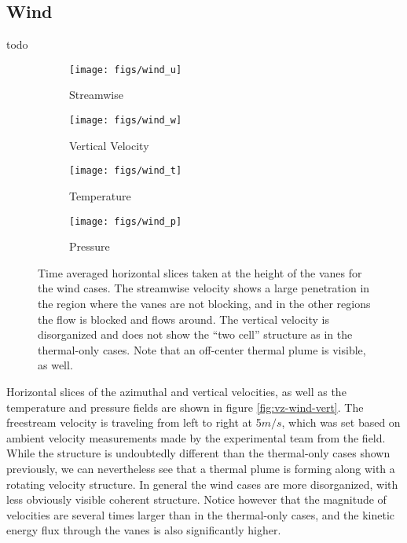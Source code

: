 \subsection{Wind}

todo

%
%
\begin{figure}[htb]

 \begin{subfigure}{.5\textwidth}
  \centering
  \texttt{[image: figs/wind\_u]}
  \caption{Streamwise}
  \label{fig:vt-wind}
 \end{subfigure}%
 \begin{subfigure}{.5\textwidth}
  \centering
  \texttt{[image: figs/wind\_w]}
  \caption{Vertical Velocity}
  \label{fig:vz-wind}
 \end{subfigure}%


 \begin{subfigure}{.5\textwidth}
  \centering
  \texttt{[image: figs/wind\_t]}
  \caption{Temperature}
  \label{fig:t-wind}
 \end{subfigure}%
 \begin{subfigure}{.5\textwidth}
  \centering
  \texttt{[image: figs/wind\_p]}
  \caption{Pressure}
  \label{fig:p-wind}
 \end{subfigure}%

 \caption{Time averaged horizontal slices taken at the height of the
 vanes for the wind cases. The streamwise velocity shows a large
 penetration in the region where the vanes are not blocking, and in the
 other regions the flow is blocked and flows around. The vertical
 velocity is disorganized and does not show the ``two cell'' structure
 as in the thermal-only cases.  Note that an
 off-center thermal plume is visible, as well.  } 
 \label{fig:wind-hor}
\end{figure}


Horizontal slices of the azimuthal and vertical velocities, as well as the 
temperature and pressure fields are shown in figure
\ref{fig:vz-wind-vert}. The freestream velocity is traveling from left
to right at 5$ m/s$, which was set based on ambient velocity
measurements made by  the experimental team from the field. While the
structure is undoubtedly different than the thermal-only cases shown
previously, we can nevertheless see that a thermal plume is forming
along with a rotating velocity structure. In general the wind cases are
more disorganized, with less obviously visible coherent
structure. Notice however that the magnitude of velocities are several
times larger than  in the thermal-only cases, and the kinetic energy
flux through the vanes is also significantly higher.  

